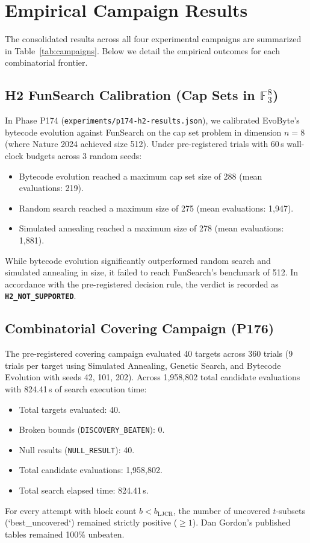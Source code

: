 \documentclass[11pt,a4paper]{article}
\begin{document}
\section{Empirical Campaign Results}
\label{sec:results}

The consolidated results across all four experimental campaigns are summarized in Table~\ref{tab:campaigns}. Below we detail the empirical outcomes for each combinatorial frontier.

\subsection{H2 FunSearch Calibration (Cap Sets in $\mathbb{F}_3^8$)}
In Phase P174 (\texttt{experiments/p174-h2-results.json}), we calibrated EvoByte's bytecode evolution against FunSearch on the cap set problem in dimension $n=8$ (where Nature 2024 \cite{romeraparedes2024nature} achieved size 512). Under pre-registered trials with 60\,s wall-clock budgets across 3 random seeds:
\begin{itemize}
    \item Bytecode evolution reached a maximum cap set size of 288 (mean evaluations: 219).
    \item Random search reached a maximum size of 275 (mean evaluations: 1,947).
    \item Simulated annealing reached a maximum size of 278 (mean evaluations: 1,881).
\end{itemize}
While bytecode evolution significantly outperformed random search and simulated annealing in size, it failed to reach FunSearch's benchmark of 512. In accordance with the pre-registered decision rule, the verdict is recorded as \textbf{\texttt{H2\_NOT\_SUPPORTED}}.

\subsection{Combinatorial Covering Campaign (P176)}
The pre-registered covering campaign evaluated 40 targets across 360 trials (9 trials per target using Simulated Annealing, Genetic Search, and Bytecode Evolution with seeds 42, 101, 202). Across 1,958,802 total candidate evaluations with 824.41\,s of search execution time:
\begin{itemize}
    \item Total targets evaluated: 40.
    \item Broken bounds (\texttt{DISCOVERY\_BEATEN}): 0.
    \item Null results (\texttt{NULL\_RESULT}): 40.
    \item Total candidate evaluations: 1,958,802.
    \item Total search elapsed time: 824.41\,s.
\end{itemize}
For every attempt with block count $b < b_{\text{LJCR}}$, the number of uncovered $t$-subsets (`best\_uncovered`) remained strictly positive ($\ge 1$). Dan Gordon's published tables remained 100\% unbeaten.
\end{document}
